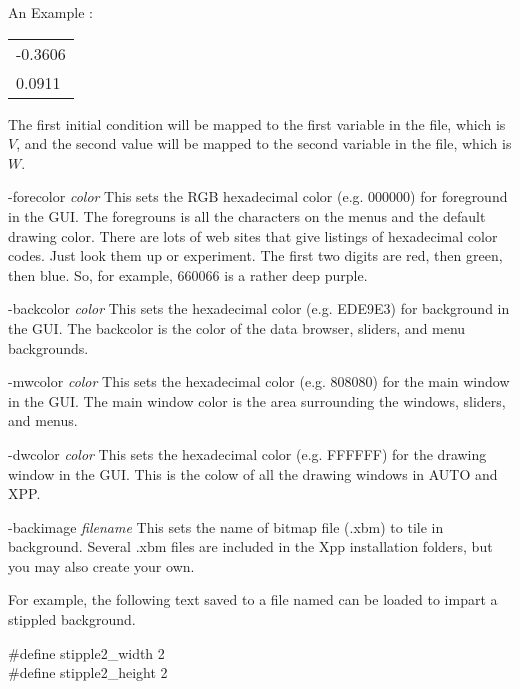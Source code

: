 \begin{description}
\begin{center}
\begin{minipage}{55ex}
\begin{center}An Example {}:
\end{center}\ttfamily
\begin{tabular}{l}
-0.3606\\
0.0911 \\
\end{tabular}
\end{minipage}
\end{center}
The first initial condition will be mapped to the first variable in the {} file, which is $V$, and the second value will be mapped to the second variable in the {} file, which is $W$. 
\item{-forecolor \emph{color}} This sets the RGB hexadecimal color (e.g. 000000) for foreground in the GUI. The foregrouns is all the characters on the menus and the default drawing color. There are lots of web sites that give listings of hexadecimal color codes. Just look them up or experiment. The first two digits are red, then green, then blue. So, for example, 660066 is a rather deep purple.  
\item{-backcolor \emph{color}} This sets the hexadecimal color (e.g. EDE9E3) for background in the GUI. The backcolor is the color of the data browser, sliders, and menu backgrounds.
\item{-mwcolor \emph{color}} This sets the hexadecimal color (e.g. 808080) for the main window in the GUI. The main window color is the area surrounding the windows, sliders, and menus.
\item{-dwcolor \emph{color}} This sets the hexadecimal color (e.g. FFFFFF) for the drawing window in the GUI. This is the colow of all the drawing windows in AUTO and XPP. 
\item{-backimage \emph{filename}} This sets the name of bitmap file (.xbm) to tile in background. Several .xbm files are included in the Xpp installation folders, but you may also create your own. 
\begin{center}\begin{minipage}{65ex}
For example, the following text saved to a file named {}
can be loaded to impart a stippled background.
\begin{center}\ttfamily\begin{minipage}{40ex}
\#define stipple2\_width 2 \\
\#define stipple2\_height 2 \\

\end{minipage}
\end{center}
\end{minipage}
\end{center}
\end{description}
